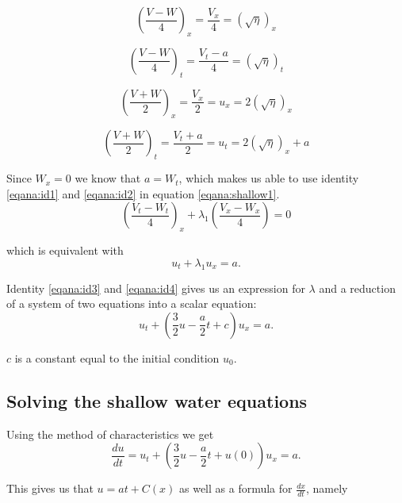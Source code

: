 \documentclass[11pt]{article}
\begin{document}
\begin{equation}
\left(\frac{V-W}{4}\right)_x = \frac{V_x}{4} = \left( \sqrt{\eta}\right)_x
\label{eqana:id1}
\end{equation}

\begin{equation}
\left(\frac{V-W}{4}\right)_t = \frac{V_t - a}{4} = \left( \sqrt{\eta}\right)_t
\label{eqana:id2}
\end{equation}

\begin{equation}
\left(\frac{V+W}{2}\right)_x = \frac{V_x}{2} = u_x = 2\left( \sqrt{\eta}\right)_x
\label{eqana:id3}
\end{equation}

\begin{equation}
\left(\frac{V+W}{2}\right)_t = \frac{V_t + a}{2} = u_t = 2\left( \sqrt{\eta}\right)_x + a
\label{eqana:id4}
\end{equation}

Since $W_x = 0$ we know that $a = W_t$, which makes us able to use identity \ref{eqana:id1} and \ref{eqana:id2} in equation \ref{eqana:shallow1}.
\begin{equation*}
\left( \frac{V_t - W_t}{4} \right)_x + \lambda_1 \left( \frac{V_x - W_x}{4} \right) = 0
\end{equation*}

which is equivalent with
\begin{equation*}
u_t + \lambda_1 u_x = a.
\end{equation*}

Identity \ref{eqana:id3} and \ref{eqana:id4} gives us an expression for $\lambda$ and a reduction of a system of two equations into a scalar equation:
\begin{equation*}
u_t + \left(\frac{3}{2}u - \frac{a}{2}t + c\right) u_x = a.
\end{equation*}

$c$ is a constant equal to the initial condition $u_0$.

\subsection{Solving the shallow water equations}
Using the method of characteristics we get 
\begin{equation*}
\frac{d u}{dt} = u_t + \left(\frac{3}{2}u - \frac{a}{2}t + u(0) \right) u_x = a.
\end{equation*}

This gives us that $u = at + C(x)$ as well as a formula for $\frac{d x}{d t}$, namely
\end{document}
